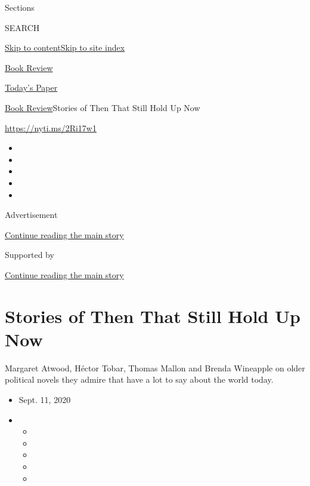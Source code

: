 Sections

SEARCH

\protect\hyperlink{site-content}{Skip to
content}\protect\hyperlink{site-index}{Skip to site index}

\href{https://www.nytimes3xbfgragh.onion/section/books/review}{Book
Review}

\href{https://myaccount.nytimes3xbfgragh.onion/auth/login?response_type=cookie\&client_id=vi}{}

\href{https://www.nytimes3xbfgragh.onion/section/todayspaper}{Today's
Paper}

\href{/section/books/review}{Book Review}\textbar{}Stories of Then That
Still Hold Up Now

\url{https://nyti.ms/2Ri17w1}

\begin{itemize}
\item
\item
\item
\item
\item
\end{itemize}

Advertisement

\protect\hyperlink{after-top}{Continue reading the main story}

Supported by

\protect\hyperlink{after-sponsor}{Continue reading the main story}

\hypertarget{stories-of-then-that-still-hold-up-now}{%
\section{Stories of Then That Still Hold Up
Now}\label{stories-of-then-that-still-hold-up-now}}

Margaret Atwood, Héctor Tobar, Thomas Mallon and Brenda Wineapple on
older political novels they admire that have a lot to say about the
world today.

\begin{itemize}
\item
  Sept. 11, 2020
\item
  \begin{itemize}
  \item
  \item
  \item
  \item
  \item
  \end{itemize}
\end{itemize}

